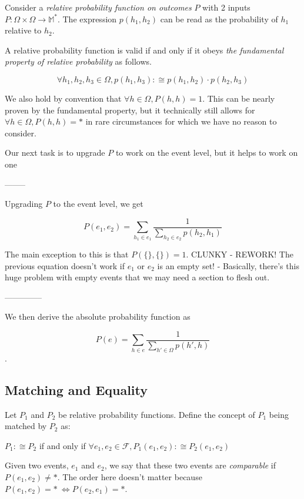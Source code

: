 \documentclass[twoside]{article}
\begin{document}
Consider a \textit{relative probability function on outcomes} \(P\) with 2 inputs \(P: \Omega \times \Omega \rightarrow \mathbb{M}^*\). The expression \(p(h_1, h_2)\) can be read as the probability of \(h_1\) relative to \(h_2\).

A relative probability function is valid if and only if it obeys \textit{the fundamental property of relative probability} as follows.

\[\forall h_1, h_2, h_3 \in \Omega, p(h_1, h_3) :\cong p(h_1, h_2) \cdot p(h_2, h_3)\]

We also hold by convention that \(\forall h \in \Omega, P(h, h) = 1\). This can be nearly proven by the fundamental property, but it technically still allows for \(\forall h \in \Omega, P(h, h) = \ast\) in rare circumstances for which we have no reason to consider.

Our next task is to upgrade \(P\) to work on the event level, but it helps to work on one

--------

Upgrading \(P\) to the event level, we get

\[P(e_1, e_2) = \sum_{h_1 \in e_1} \frac{1}{\sum_{h_2 \in e_2} p(h_2, h_1)}\]

The main exception to this is that \(P(\{\},\{\}) = 1\). CLUNKY - REWORK! The previous equation doesn't work if \(e_1\) or \(e_2\) is an empty set!
- Basically, there's this huge problem with empty events that we may need a section to flesh out.

--------------

We then derive the absolute probability function as

\[P(e) = \sum_{h \in e} \frac{1}{\sum_{h' \in \Omega}p(h', h)}\].

\subsection{Matching and Equality}

Let \(P_1\) and \(P_2\) be relative probability functions. Define the concept of \(P_1\) being matched by \(P_2\) as:

\(P_1 :\cong P_2\) if and only if \(\forall e_1, e_2 \in \mathcal{F}, P_1(e_1, e_2) :\cong P_2(e_1, e_2)\)

Given two events, \(e_1\) and \(e_2\), we say that these two events are \textit{comparable} if \(P(e_1, e_2) \neq \ast\). The order here doesn't matter because \(P(e_1, e_2) = \ast\ \Leftrightarrow P(e_2, e_1) = \ast\).
\end{document}
